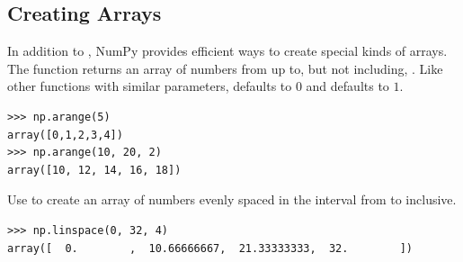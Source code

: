 \subsection*{Creating Arrays}
In addition to , NumPy provides efficient ways to create special kinds of arrays. The function  returns an array of numbers from  up to, but not including, . Like other functions with similar parameters,  defaults to $0$ and  defaults to $1$. 

\begin{lstlisting}
>>> np.arange(5)
array([0,1,2,3,4])
>>> np.arange(10, 20, 2) 
array([10, 12, 14, 16, 18])
\end{lstlisting}

Use  to create an array of  numbers evenly spaced in the interval from  to  inclusive.
\begin{lstlisting}
>>> np.linspace(0, 32, 4) 
array([  0.        ,  10.66666667,  21.33333333,  32.        ])
\end{lstlisting} 

